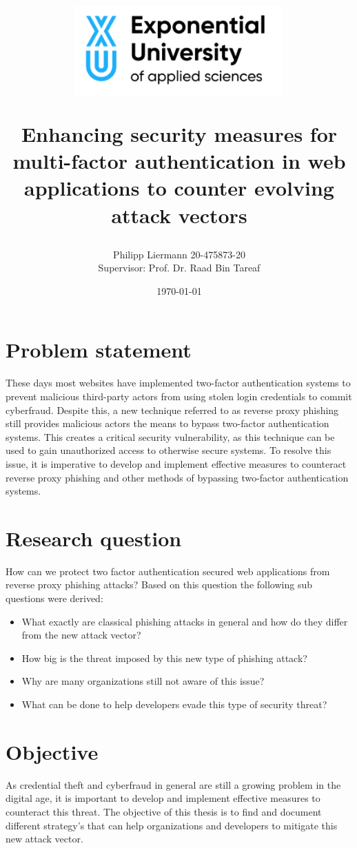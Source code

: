 \documentclass [14pt]{extarticle}
\author{Philipp Liermann 20-475873-20\\Supervisor: Prof. Dr. Raad Bin Tareaf}
\date{\today}
\title{
	\begin{center}
		\includegraphics[width=8cm]{./images/logo.png}
	\end{center}
	\vspace{2cm}
        Enhancing security measures for multi-factor authentication in web applications to counter evolving attack vectors
	\vspace{2cm}
	\large 
}
\begin{document}
\maketitle

\newpage
\tableofcontents

\newpage
\section{Problem statement}
These days most websites have implemented two-factor authentication systems to prevent malicious third-party actors from using stolen login credentials to commit cyberfraud. Despite this, a new technique referred to as reverse proxy phishing still provides malicious actors the means to bypass two-factor authentication systems. This creates a critical security vulnerability, as this technique can be used to gain unauthorized access to otherwise secure systems. To resolve this issue, it is imperative to develop and implement effective measures to counteract reverse proxy phishing and other methods of bypassing two-factor authentication systems.

\section{Research question}
How can we protect two factor authentication secured web applications from reverse proxy phishing attacks?
Based on this question the following sub questions were derived:
\begin{itemize}
	\item What exactly are classical phishing attacks in general and how do they differ from the new attack vector?
	\item How big is the threat imposed by this new type of phishing attack?
	\item Why are many organizations still not aware of this issue?
	\item What can be done to help developers evade this type of security threat?
\end{itemize}

\section{Objective}
As credential theft and cyberfraud in general are still a growing problem in the digital age, it is important to develop and implement effective measures to counteract this threat. The objective of this thesis is to find and document different strategy's that can help organizations and developers to mitigate this new attack vector.
\end{document}
